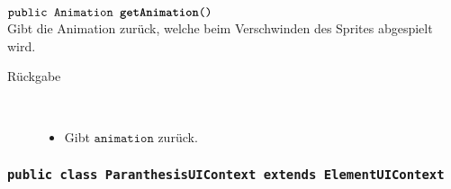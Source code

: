 \begin{description}
		\item $\texttt{public Animation \textbf{getAnimation}()}$ \\ Gibt die Animation zurück, welche beim Verschwinden des Sprites abgespielt wird.
		\begin{description}
			\item[Rückgabe] \hfill \\
			\vspace{-.8cm}
			\begin{itemize}
				\item Gibt $\texttt{animation}$ zurück.
			\end{itemize}
			\end{description}
			
			

	\end{description}
			
		\subsubsection{\normalfont \texttt{public class \textbf{ParanthesisUIContext} extends ElementUIContext}}

